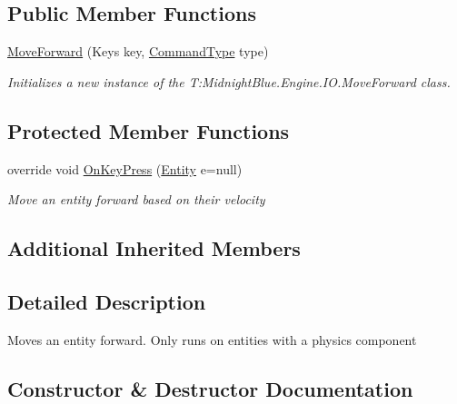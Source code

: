 \subsection*{Public Member Functions}
\begin{DoxyCompactItemize}
\item 
\hyperlink{class_midnight_blue_1_1_engine_1_1_i_o_1_1_move_forward_ad0326fe0ab29253e1adc468e2f343f2f}{Move\+Forward} (Keys key, \hyperlink{namespace_midnight_blue_1_1_engine_1_1_i_o_a8bc3f159399ecadd590f7df1b54354b0}{Command\+Type} type)
\begin{DoxyCompactList}\small\item\em Initializes a new instance of the T\+:\+Midnight\+Blue.\+Engine.\+I\+O.\+Move\+Forward class. \end{DoxyCompactList}\end{DoxyCompactItemize}
\subsection*{Protected Member Functions}
\begin{DoxyCompactItemize}
\item 
override void \hyperlink{class_midnight_blue_1_1_engine_1_1_i_o_1_1_move_forward_af8ec50143e331661a140b7aea0245616}{On\+Key\+Press} (\hyperlink{class_midnight_blue_1_1_engine_1_1_entity_component_1_1_entity}{Entity} e=null)
\begin{DoxyCompactList}\small\item\em Move an entity forward based on their velocity \end{DoxyCompactList}\end{DoxyCompactItemize}
\subsection*{Additional Inherited Members}


\subsection{Detailed Description}
Moves an entity forward. Only runs on entities with a physics component 



\subsection{Constructor \& Destructor Documentation}
\hypertarget{class_midnight_blue_1_1_engine_1_1_i_o_1_1_move_forward_ad0326fe0ab29253e1adc468e2f343f2f}{}\label{class_midnight_blue_1_1_engine_1_1_i_o_1_1_move_forward_ad0326fe0ab29253e1adc468e2f343f2f} 
